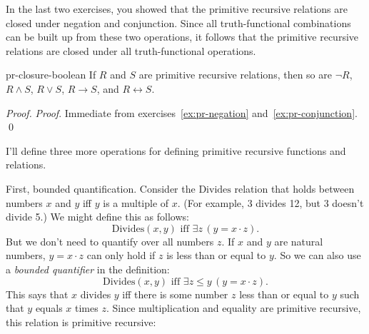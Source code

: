In the last two exercises,
you showed that the primitive recursive relations are closed under negation and conjunction.
Since all truth-functional combinations can be built up from these two operations,
it follows that the primitive recursive relations are closed under all truth-functional operations.

\begin{proposition}{}{pr-closure-boolean}
  If $R$ and $S$ are primitive recursive relations, then so are $\neg R$, $R \land S$, $R \lor S$, $R \to S$, and $R \leftrightarrow S$.
\end{proposition}
\begin{proof}
  \emph{Proof}.
  Immediate from exercises~\ref{ex:pr-negation} and~\ref{ex:pr-conjunction}. \qed
\end{proof}

I'll define three more operations for defining primitive recursive functions and relations.

First, bounded quantification.
Consider the $\mathrm{Divides}$ relation
that holds between numbers $x$ and $y$ iff $y$ is a multiple of $x$.
(For example, 3 divides 12, but 3 doesn't divide 5.)
We might define this as follows:
\[
  \mathrm{Divides}(x,y) \text{ iff } \exists z \,(y = x \cdot z).
\]
But we don't need to quantify over all numbers $z$.
If $x$ and $y$ are natural numbers,
$y = x \cdot z$ can only hold if $z$ is less than or equal to $y$.
So we can also use a \emph{bounded quantifier} in the definition:
\[
  \mathrm{Divides}(x,y) \text{ iff } \exists z \!\leq\! y \,(y = x \cdot z).
\]
This says that $x$ divides $y$ iff
there is some number $z$ less than or equal to $y$
such that $y$ equals $x$ times $z$.
Since multiplication and equality are primitive recursive,
this relation is primitive recursive:

